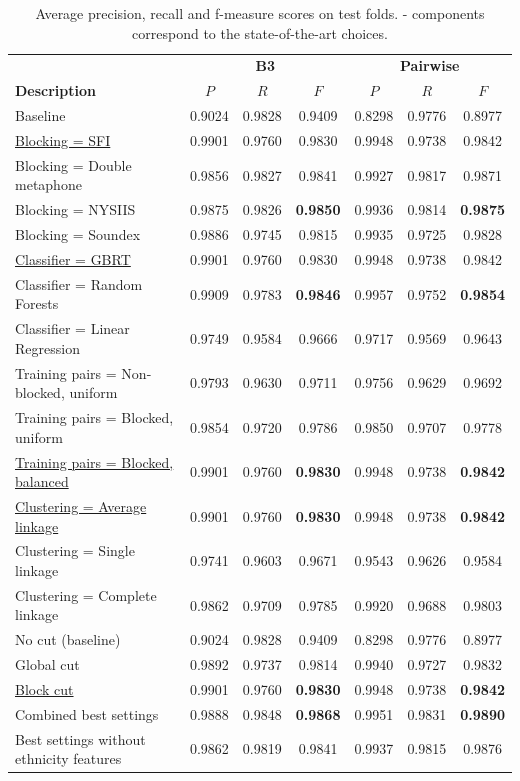\documentclass[runningheads,a4paper]{llncs}
\begin{document}
\begin{small}
\begin{table}
\caption{Average precision, recall and f-measure scores on test folds. - components correspond to the state-of-the-art choices.}
\label{table:results}
\centering
\begin{tabular}{|l|c c c | c c c|}
  \hline
                       & \multicolumn{3}{|c|}{\textbf{B3}} & \multicolumn{3}{|c|}{\textbf{Pairwise}}\\
  \textbf{Description} & $P$ & $R$ & $F$ & $P$ & $R$ & $F$ \\
  \hline
  \hline
Baseline & 0.9024 & 0.9828 & 0.9409  & 0.8298 & 0.9776 & 0.8977 \\
\hline
\underline{Blocking = SFI} & 0.9901 & 0.9760 & 0.9830  & 0.9948 & 0.9738 & 0.9842\\
Blocking = Double metaphone & 0.9856 & 0.9827 & 0.9841  & 0.9927 & 0.9817 & 0.9871 \\
Blocking = NYSIIS & 0.9875 & 0.9826 & \textbf{0.9850}  & 0.9936 & 0.9814 & \textbf{0.9875} \\
Blocking = Soundex & 0.9886 & 0.9745 & 0.9815 & 0.9935 & 0.9725 & 0.9828 \\
\hline
\underline{Classifier = GBRT} & 0.9901 & 0.9760 & 0.9830   & 0.9948 & 0.9738 & 0.9842 \\
Classifier = Random Forests & 0.9909 & 0.9783 & \textbf{0.9846}  & 0.9957 & 0.9752 & \textbf{0.9854} \\
Classifier = Linear Regression & 0.9749 & 0.9584 & 0.9666 & 0.9717 & 0.9569 & 0.9643 \\
\hline
Training pairs = Non-blocked, uniform & 0.9793 & 0.9630 & 0.9711  & 0.9756 & 0.9629 & 0.9692 \\
Training pairs = Blocked, uniform & 0.9854 & 0.9720 & 0.9786  & 0.9850 & 0.9707 & 0.9778 \\
\underline{Training pairs = Blocked, balanced} & 0.9901 & 0.9760 & \textbf{0.9830}  & 0.9948 & 0.9738 & \textbf{0.9842} \\
\hline
\underline{Clustering = Average linkage} & 0.9901 & 0.9760 & \textbf{0.9830}  & 0.9948 & 0.9738 & \textbf{0.9842} \\
Clustering = Single linkage & 0.9741 & 0.9603 & 0.9671  & 0.9543 & 0.9626 & 0.9584 \\
Clustering = Complete linkage & 0.9862 & 0.9709 & 0.9785  & 0.9920 & 0.9688 & 0.9803 \\
\hline
No cut (baseline) & 0.9024 & 0.9828 & 0.9409  & 0.8298 & 0.9776 & 0.8977 \\
Global cut & 0.9892 & 0.9737 & 0.9814  & 0.9940 & 0.9727 & 0.9832 \\
\underline{Block cut} & 0.9901 & 0.9760 & \textbf{0.9830}  & 0.9948 & 0.9738 & \textbf{0.9842} \\
\hline
Combined best settings & 0.9888 & 0.9848 & \textbf{0.9868}  & 0.9951 & 0.9831 & \textbf{0.9890} \\
Best settings without ethnicity features & 0.9862 & 0.9819 & 0.9841 & 0.9937 & 0.9815 & 0.9876 \\
  \hline
\end{tabular}
\end{table}
\end{small}
\end{document}
